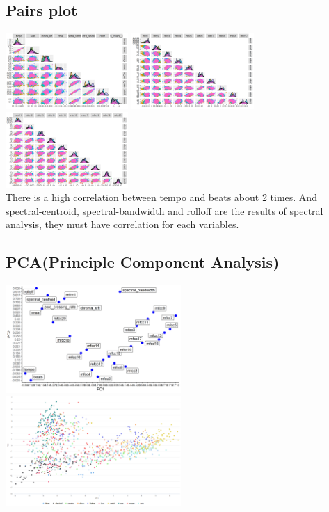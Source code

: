 \documentclass[12pt,a4paper]{article}
\begin{document}
\subsection{Pairs plot}
\includegraphics[width=0.35\textwidth]{ggpairs1.png}
\includegraphics[width=0.35\textwidth]{ggpairs2.png}
\includegraphics[width=0.35\textwidth]{ggpairs3.png}
\\
There is a high correlation between tempo and beats about 2 times. And spectral-centroid, spectral-bandwidth and rolloff are the results of spectral analysis, they must have correlation for each variables.

\newpage
\subsection{PCA(Principle Component Analysis)}
\includegraphics[width=0.5\textwidth]{pca_feat.png}
\includegraphics[width=0.5\textwidth]{pca.png}
\end{document}
